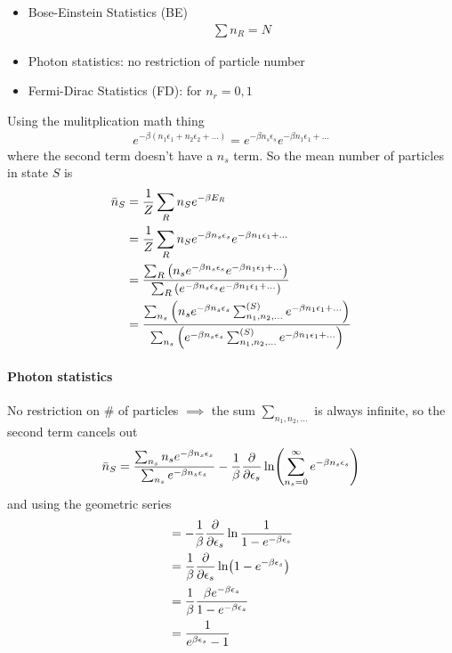 \documentclass[../main.tex]{subfiles}
\begin{document}
\newpage
{}
\begin{itemize}
    \item Bose-Einstein Statistics (BE)
    \begin{align*}
        \sum n_R = N
    \end{align*}
    \item Photon statistics: no restriction of particle number
    \item Fermi-Dirac Statistics (FD): for $n_r = 0, 1$
\end{itemize}
Using the mulitplication math thing
\begin{align*}
    e^{-\beta (n_1 \epsilon_1 + n_2 \epsilon_2 + \dots)} = e^{-\beta n_s \epsilon_s} e^{-\beta n_1 \epsilon_1 + \dots}
\end{align*}
where the second term doesn't have a $n_s$ term. So the mean number of particles in state $S$ is
\begin{align*}
    \bar n_S &= \frac{1}{Z} \sum_R n_S e^{-\beta E_R} \\ 
    &= \frac{1}{Z} \sum_R n_S e^{-\beta n_s \epsilon_s} e^{-\beta n_1 \epsilon_1 + \dots} \\
    &= \frac{
        \sum_{R} \qt(
            n_s e^{-\beta n_s \epsilon_s} e^{-\beta n_1 \epsilon_1 + \dots}
        )
    }
    {
        \sum_R \qt(
            e^{-\beta n_s \epsilon_s} e^{-\beta n_1 \epsilon_1 + \dots}
        )
    } \\
    &= \frac{
        \sum_{n_s} \qt(
            n_s e^{-\beta n_s \epsilon_s} \sum_{n_1, n_2, \dots}^{(S)} e^{-\beta n_1 \epsilon_1 + \dots}
        )
    }
    {
        \sum_{n_s} \qt(
            e^{-\beta n_s \epsilon_s} \sum_{n_1, n_2, \dots}^{(S)} e^{-\beta n_1 \epsilon_1 + \dots}
        )
    }
\end{align*}
\paragraph{Photon statistics} No restriction on \# of particles $\implies$ the sum $\sum_{n_1, n_2, \dots}$ is always infinite,
so the second term cancels out
\begin{align*}
    \bar n_S = \frac{
        \sum_{n_s} n_s e^{-\beta n_s \epsilon_s}
    }
    {
        \sum_{n_s} e^{-\beta n_s \epsilon_s}
    } -\frac{1}{\beta} \pdv{\epsilon_s} \ln(\sum_{n_s = 0}^\infty e^{-\beta n_s \epsilon_s})
\end{align*}
and using the geometric series
\begin{align*}
    &= -\frac{1}{\beta} \pdv{\epsilon_s} \ln \frac{1}{1 - e^{-\beta \epsilon_s}} \\
    &= \frac{1}{\beta} \pdv{\epsilon_s} \ln(1 - e^{-\beta \epsilon_s}) \\
    &= \frac{1}{\beta} \frac{\beta e^{-\beta \epsilon_s}}{1 - e^{-\beta \epsilon_s}} \\
    &= \frac{1}{e^{\beta \epsilon_s} - 1}
\end{align*}
\end{document}
